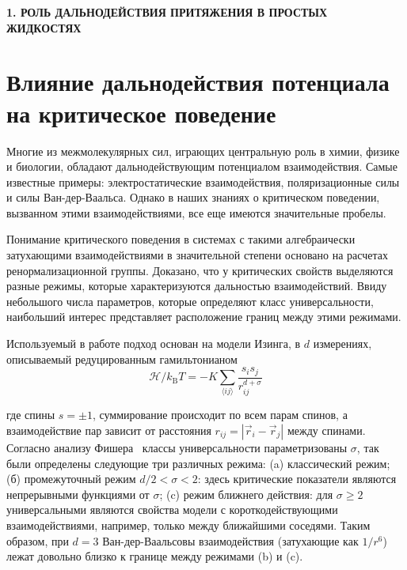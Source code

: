 \newpage
\begin{center}
  \textbf{\large 1. РОЛЬ ДАЛЬНОДЕЙСТВИЯ ПРИТЯЖЕНИЯ В ПРОСТЫХ ЖИДКОСТЯХ}
\end{center}


\section{Влияние дальнодействия потенциала на критическое поведение}

Многие из межмолекулярных сил, играющих центральную роль в химии, физике и биологии, обладают дальнодействующим потенциалом взаимодействия.
Самые известные примеры: электростатические взаимодействия, поляризационные силы и силы Ван-дер-Ваальса.
Однако в наших знаниях о критическом поведении, вызванном этими взаимодействиями, все еще имеются значительные пробелы.

Понимание критического поведения в системах с такими алгебраически затухающими взаимодействиями в значительной степени основано на расчетах ренормализационной группы.
Доказано, что у критических свойств выделяются разные режимы, которые характеризуются дальностью взаимодействий.
Ввиду небольшого числа параметров, которые определяют класс универсальности, наибольший интерес представляет расположение границ между этими режимами.


Используемый в работе подход основан на модели Изинга, в $d$ измерениях, описываемый редуцированным гамильтонианом
\begin{equation}
  \mathcal{H} / k_{\mathrm{B}} T=-K \sum_{\langle i j\rangle} \frac{s_{i} s_{j}}{r_{i j}^{d+\sigma}}
  \label{eq1}
\end{equation}

где спины $s=\pm 1$, суммирование происходит по всем парам спинов, а взаимодействие пар зависит от расстояния $r_{i j}=\left|\vec {r}_{i}-\vec{r}_{j}\right|$ между спинами. 
Согласно анализу Фишера~\cite{10.1103/PhysRevLett.29.917} классы универсальности параметризованы $\sigma$, так были определены следующие три различных режима: (a) классический режим; (б) промежуточный режим $d/2<\sigma<2$: здесь критические показатели являются непрерывными функциями от $\sigma$; (c) режим ближнего действия: для $\sigma\geq 2$ универсальными являются свойства модели с короткодействующими взаимодействиями, например, только между ближайшими соседями. 
Таким образом, при $d=3$ Ван-дер-Ваальсовы взаимодействия (затухающие как $1/r^{6}$) лежат довольно близко к границе между режимами (b) и (c).

